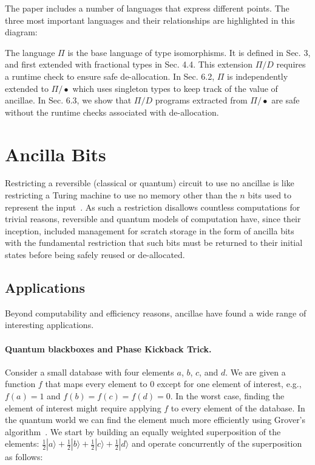 \documentclass[sigplan,10pt,review,anonymous]{acmart}
\newcommand{\ket}[1]{|#1\rangle}
\begin{document}
The paper includes a number of languages that express different
points. The three most important languages and their relationships are
highlighted in this diagram:

\vspace{-\baselineskip}

\begin{center}

\end{center}

\vspace{-1.5\baselineskip}

\noindent The language $\Pi$ is the base language of type isomorphisms. It is
defined in Sec. 3, and first extended with fractional types in
Sec. 4.4. This extension $\Pi/D$ requires a runtime check to ensure
safe de-allocation. In Sec. 6.2, $\Pi$ is independently extended to
$\Pi/\bullet$ which uses singleton types to keep track of the value of
ancillae. In Sec. 6.3, we show that $\Pi/D$ programs extracted from
$\Pi/\bullet$ are safe without the runtime checks associated with
de-allocation.

\section{Ancilla Bits}
\label{sec:examples}

Restricting a reversible (classical or quantum) circuit to use no
ancillae is like restricting a Turing machine to use no memory other
than the $n$ bits used to represent the
input~\cite{aaronson_et_al:LIPIcs:2017:8173}. As such a restriction
disallows countless computations for trivial reasons, reversible and
quantum models of computation have, since their inception, included
management for scratch storage in the form of ancilla
bits~\cite{Toffoli:1980} with the fundamental restriction that such
bits must be returned to their initial states before being safely
reused or de-allocated.

\subsection{Applications}

Beyond computability and efficiency reasons, ancillae have found a
wide range of interesting applications.

\paragraph*{Quantum blackboxes and Phase Kickback Trick.} Consider a
small database with four elements $a$, $b$, $c$, and $d$. We are given
a function $f$ that maps every element to $0$ except for one element
of interest, e.g., $f(a)=1$ and $f(b)=f(c)=f(d)=0$. In the worst case,
finding the element of interest might require applying $f$ to every
element of the database. In the quantum world we can find the element
much more efficiently using Grover's
algorithm~\cite{Grover:1996:FQM:237814.237866}. We start by building
an equally weighted superposition of the elements:
$\frac{1}{2}\ket{a}+\frac{1}{2}\ket{b}+\frac{1}{2}\ket{c}+\frac{1}{2}\ket{d}$
and operate concurrently of the superposition as follows:
\end{document}
